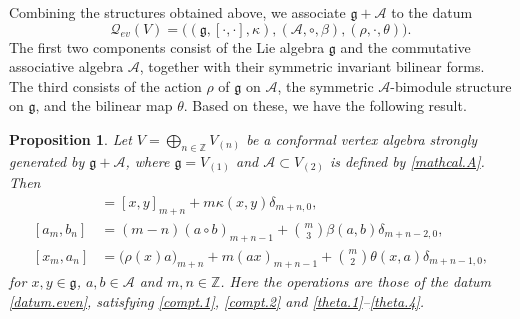 \documentclass[12pt]{article}
\numberwithin{equation}{section}
\newtheorem{proposition}[theorem]{Proposition}
\theoremstyle{definition}
\theoremstyle{plain}
\newcommand{\bZ}{\ensuremath{\mathbb{Z}}}
\newcommand{\fg}{\mathfrak{g}}
\newcommand{\cA}{\ensuremath{\mathcal{A}}}
\newcommand{\cQ}{\ensuremath{\mathcal{Q}}}
\begin{document}
Combining the structures obtained above, we associate $\fg+\cA$ to the datum
\begin{equation}\label{datum.even}
    \cQ_{ev}(V)=\big((\fg,[\cdot,\cdot],\kappa),(\cA,\circ,\beta),(\rho,\cdot,\theta)\big).
\end{equation}
The first two components consist of the Lie algebra $\fg$ and the commutative associative algebra $\cA$, together with their symmetric invariant bilinear forms. The third consists of the action $\rho$ of $\fg$ on $\cA$, the symmetric $\cA$-bimodule structure on $\fg$, and the bilinear map $\theta$. Based on these, we have the following result.

\begin{proposition}\label{prop:even.mode.relations}
    Let $V=\bigoplus_{n\in\bZ}V_{(n)}$ be a conformal vertex algebra strongly generated by $\fg+\cA$, where $\fg=V_{(1)}$ and $\cA\subset V_{(2)}$ is defined by \eqref{mathcal.A}. Then 
    \begin{align}
        [x_m,y_n]&=[x,y]_{m+n}+m\kappa(x,y)\delta_{m+n,0},\label{even.mode.gg}\\
        [a_m,b_n]&=(m-n)(a\circ b)_{m+n-1}
            +\binom{m}{3}\beta(a,b)\delta_{m+n-2,0},\label{even.mode.AA}\\
        [x_m,a_n]&=\big(\rho(x)a\big)_{m+n}+m(ax)_{m+n-1}
            +\binom{m}{2}\theta(x,a)\delta_{m+n-1,0},\label{even.mode.gA}
    \end{align}
    for $x,y\in\fg$, $a,b\in\cA$ and $m,n\in\bZ$. Here the operations are those of the datum \eqref{datum.even}, satisfying \eqref{compt.1}, \eqref{compt.2} and \eqref{theta.1}--\eqref{theta.4}.
\end{proposition}
\end{document}
